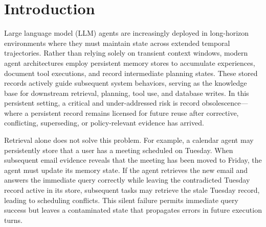 \section{Introduction}

Large language model (LLM) agents are increasingly deployed in long-horizon environments where they must maintain state across extended temporal trajectories. Rather than relying solely on transient context windows, modern agent architectures employ persistent memory stores to accumulate experiences, document tool executions, and record intermediate planning states. These stored records actively guide subsequent system behaviors, serving as the knowledge base for downstream retrieval, planning, tool use, and database writes. In this persistent setting, a critical and under-addressed risk is record obsolescence—where a persistent record remains licensed for future reuse after corrective, conflicting, superseding, or policy-relevant evidence has arrived. 

Retrieval alone does not solve this problem. For example, a calendar agent may persistently store that a user has a meeting scheduled on Tuesday. When subsequent email evidence reveals that the meeting has been moved to Friday, the agent must update its memory state. If the agent retrieves the new email and answers the immediate query correctly while leaving the contradicted Tuesday record active in its store, subsequent tasks may retrieve the stale Tuesday record, leading to scheduling conflicts. This silent failure permits immediate query success but leaves a contaminated state that propagates errors in future execution turns.

